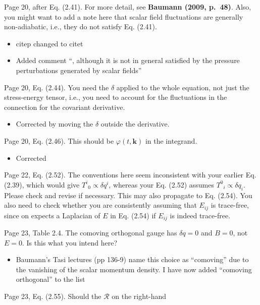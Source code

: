 \documentclass[11pt]{article}
\newcommand{\todo}[1]{{\color{red} #1}}
\begin{document}
\begin{enumerate}
\begin{itemize}
  \end{itemize}
\item Page 20, after Eq. (2.41). For more detail, see \textbf{Baumann
    (2009, p.~48)}. Also, you might want to add a note here that
  scalar field fluctuations are generally non-adiabatic, i.e., they do
  not satisfy Eq. (2.41).
  \begin{itemize}
    \item citep changed to citet
    \item Added comment ``, although it is not in general satisfied
      by the pressure perturbations generated by scalar fields''
  \end{itemize}
\item Page 20, Eq. (2.44). You need the $\delta$ applied to the whole
  equation, not just the stress-energy tensor, i.e., you need to
  account for the fluctuations in the connection for the covariant
  derivative.
  \begin{itemize}
    \item Corrected by moving the $\delta$ outside the derivative.
  \end{itemize}
\item Page 20, Eq. (2.46). This should be $\varphi(t,\mathbf{k})$ in
  the integrand.
  \begin{itemize}
    \item Corrected
  \end{itemize}
  \todo{
\item Page 22, Eq. (2.52). The conventions here seem inconsistent with
  your earlier Eq. (2.39), which would give $T^i{}_0 \propto \delta
  q^i$, whereas your Eq. (2.52) assumes $T^0{}_i \propto \delta
  q_i$. Please check and revise if necessary. This may also propagate
  to Eq. (2.54). You also need to check whether you are consistently
  assuming that $E_{ij}$ is trace-free, since on expects a Laplacian
  of $E$ in Eq. (2.54) if $E_{ij}$ is indeed trace-free.
}
\item Page 23, Table 2.4. The comoving orthogonal gauge has $\delta q
  = 0$ and $B=0$, not $E=0$. Is this what you intend here?
  \begin{itemize}
    \item Baumann's Tasi lectures (pp 136-9) name this choice as ``comoving'' due to the vanishing of the scalar momentum density. I have now added ``comoving orthogonal'' to the list
  \end{itemize}
\item Page 23, Eq. (2.55). Should the $\mathcal{R}$ on the right-hand

\end{enumerate}
\end{document}
